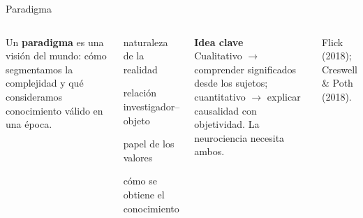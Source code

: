 \documentclass[aspectratio=169,8pt]{beamer}
\begin{document}
\begin{frame}{Paradigma}
  \begin{columns}[T,onlytextwidth]
      Un \textbf{paradigma} es una visi\'on del mundo: c\'omo segmentamos la complejidad y qu\'e consideramos conocimiento v\'alido en una \'epoca.
      \vspace{0.5em}
      \begin{tcolorbox}[infobox,title={\small Preguntas que fundan un paradigma}]
        \small
        \begin{description}[Ontolog\'ia]
          \item[Ontolog\'ia] naturaleza de la realidad
          \item[Epistemolog\'ia] relaci\'on investigador--objeto
          \item[Axiolog\'ia] papel de los valores
          \item[Metodolog\'ia] c\'omo se obtiene el conocimiento
        \end{description}
      \end{tcolorbox}
      \begin{tcolorbox}[tealbox]
        \small\textbf{Idea clave}\\ Cualitativo $\to$ comprender significados desde los sujetos; cuantitativo $\to$ explicar causalidad con objetividad. La neurociencia necesita ambos.
      \end{tcolorbox}
      \vspace{0.6em}
      {\scriptsize\color{neutral}Flick (2018); Creswell \& Poth (2018).}
  \end{columns}
\end{frame}
\end{document}
